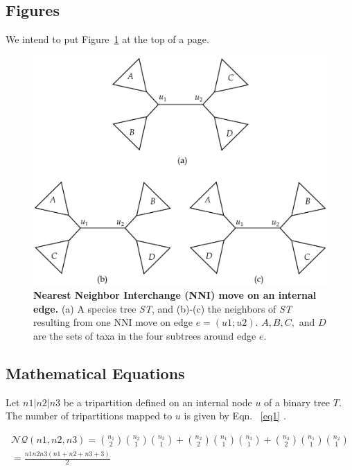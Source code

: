 \documentclass[12pt,a4paper]{article}
\begin{document}
	\subsection{Figures}
	We intend to put Figure~\ref{figNNI} at the top of a page.
	
	\begin{figure}[t]
		\centering	
		\includegraphics[scale=0.32]{Figure3.pdf}
		\caption{\textbf{Nearest Neighbor Interchange (NNI) move on an internal edge.} (a)	A species tree \textit{ST}, and (b)-(c) the neighbors of \textit{ST} resulting from one NNI move on edge $e = (u1; u2)$. $A,B,C,$ and $D$ are the sets of taxa in the four subtrees around edge $e$.}
		\label{figNNI}
		
	\end{figure}
	
	
	
	\subsection{Mathematical Equations}
	Let $n1|n2|n3$ be a tripartition defined on an internal node $u$ of a binary tree $T$. The number of tripartitions mapped to $u$ is given by Eqn. ~\ref{eq1} .
	
	\begin{equation}
		\begin{aligned}
		\mathcal{NQ}(n1,n2,n3) = \binom{n_1}{2}\binom{n_2}{1}\binom{n_3}{1}+ \binom{n_2}{2}\binom{n_1}{1}\binom{n_3}{1} + \binom{n_3}{2}\binom{n_1}{1}\binom{n_2}{1} \\
		= \frac{n1n2n3(n1 + n2 + n3 + 3)}{2}
		\end{aligned}
	\end{equation}
\end{document}
